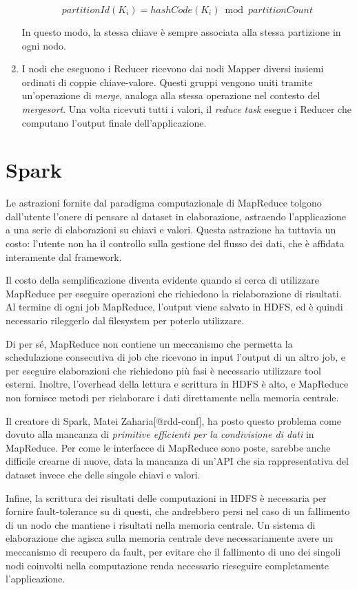 \documentclass[italian,a4paper, twoside, 12pt]{report}
\begin{document}
\begin{enumerate}
  \[partitionId(K_i) = hashCode(K_i) \bmod partitionCount\]

  In questo modo, la stessa chiave è sempre associata alla stessa
  partizione in ogni nodo.
\item
  I nodi che eseguono i Reducer ricevono dai nodi Mapper diversi insiemi
  ordinati di coppie chiave-valore. Questi gruppi vengono uniti tramite
  un'operazione di \emph{merge}, analoga alla stessa operazione nel
  contesto del \emph{mergesort}. Una volta ricevuti tutti i valori, il
  \emph{reduce task} esegue i Reducer che computano l'output finale
  dell'applicazione.
\end{enumerate}

\section{Spark}\label{spark}

Le astrazioni fornite dal paradigma computazionale di MapReduce tolgono
dall'utente l'onere di pensare al dataset in elaborazione, astraendo
l'applicazione a una serie di elaborazioni su chiavi e valori. Questa
astrazione ha tuttavia un costo: l'utente non ha il controllo sulla
gestione del flusso dei dati, che è affidata interamente dal framework.

Il costo della semplificazione diventa evidente quando si cerca di
utilizzare MapReduce per eseguire operazioni che richiedono la
rielaborazione di risultati. Al termine di ogni job MapReduce, l'output
viene salvato in HDFS, ed è quindi necessario rileggerlo dal filesystem
per poterlo utilizzare.

Di per sé, MapReduce non contiene un meccanismo che permetta la
schedulazione consecutiva di job che ricevono in input l'output di un
altro job, e per eseguire elaborazioni che richiedono più fasi è
necessario utilizzare tool esterni. Inoltre, l'overhead della lettura e
scrittura in HDFS è alto, e MapReduce non fornisce metodi per
rielaborare i dati direttamente nella memoria centrale.

Il creatore di Spark, Matei Zaharia{[}@rdd-conf{]}, ha posto questo
problema come dovuto alla mancanza di \emph{primitive efficienti per la
condivisione di dati} in MapReduce. Per come le interfacce di MapReduce
sono poste, sarebbe anche difficile crearne di nuove, data la mancanza
di un'API che sia rappresentativa del dataset invece che delle singole
chiavi e valori.

Infine, la scrittura dei risultati delle computazioni in HDFS è
necessaria per fornire fault-tolerance su di questi, che andrebbero
persi nel caso di un fallimento di un nodo che mantiene i risultati
nella memoria centrale. Un sistema di elaborazione che agisca sulla
memoria centrale deve necessariamente avere un meccanismo di recupero da
fault, per evitare che il fallimento di uno dei singoli nodi coinvolti
nella computazione renda necessario rieseguire completamente
l'applicazione.
\end{document}
